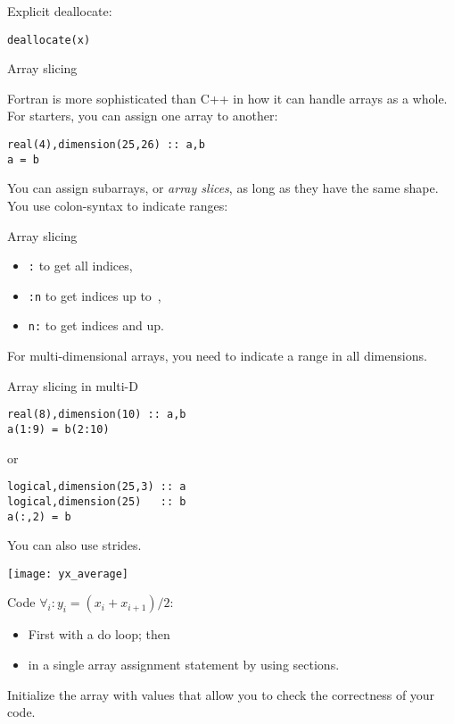 Explicit deallocate:
\begin{verbatim}
deallocate(x)
\end{verbatim}

 {Array slicing}

Fortran is more sophisticated than C++ in how it can handle arrays as
a whole. For starters, you can assign one array to another:
\begin{verbatim}
real(4),dimension(25,26) :: a,b
a = b
\end{verbatim}
You can assign subarrays, or \emph{array slices},
as long as they have the same shape. You use colon-syntax to indicate
ranges:

\begin{block}{Array slicing}
  \label{sl:farray-slices}
  \begin{itemize}
  \item {\tt :} %
    to get all indices,
  \item {\tt :n} %
    to get indices up to~,
  \item {\tt n:} %
    to get indices  and up.
  \end{itemize}
\end{block}

For multi-dimensional arrays, you need to indicate a range in all
dimensions.

\begin{block}{Array slicing in multi-D}
  \label{sl:farray-sliced}
\begin{verbatim}
real(8),dimension(10) :: a,b
a(1:9) = b(2:10)
\end{verbatim}
or
\begin{verbatim}
logical,dimension(25,3) :: a
logical,dimension(25)   :: b
a(:,2) = b
\end{verbatim}
You can also use strides.
\end{block}

\begin{exercise}
  \label{ex:farray-shift}

  \texttt{[image: yx\_average]}

  Code $\forall_i\colon y_i=(x_i+x_{i+1})/2$:
  \begin{itemize}
  \item First with a do loop; then
  \item in a single array assignment statement by using sections.
  \end{itemize}
  Initialize the array  with values that allow you to check the
  correctness of your code.
\end{exercise}

